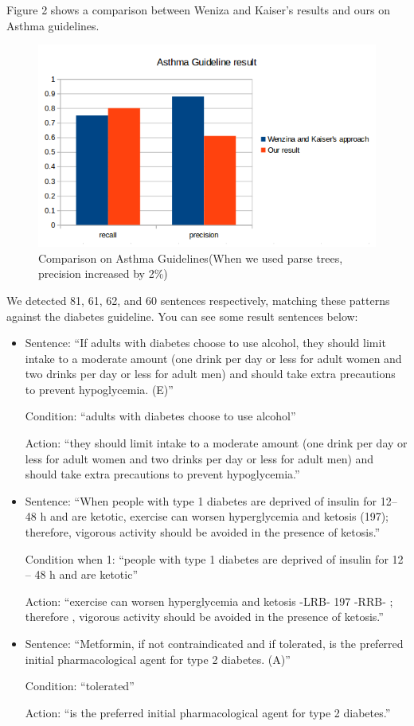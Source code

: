 \documentclass[12pt,letterpaper]{article}
\begin{document}
Figure 2 shows a comparison between Weniza and Kaiser's results and ours on Asthma guidelines.
\begin{figure}
\includegraphics[width=\textwidth]{Comparison}
\caption{Comparison on Asthma Guidelines(When we used parse trees, precision increased by 2\%)}
\end{figure}

We detected 81, 61, 62, and 60 sentences respectively, matching these patterns against the diabetes guideline. You can see some result sentences below:

\begin{itemize}
\item Sentence: ``If adults with diabetes choose to use alcohol, they should limit intake to a moderate amount (one drink per day or less for adult women and two drinks per  day or less for  adult men) and should take extra precautions to prevent hypoglycemia. (E)''

Condition: ``adults with diabetes choose to use alcohol''

Action: ``they should limit intake to a moderate amount (one drink per day or less for adult women and two drinks per day or less for adult men) and should take extra precautions to prevent hypoglycemia.''

\item Sentence: ``When people with type 1 diabetes are deprived of insulin for 12– 48 h and are ketotic, exercise can worsen hyperglycemia and ketosis (197); therefore, vigorous activity should be avoided in the presence of ketosis.''

Condition when 1: ``people with type 1 diabetes are deprived of insulin for 12 -- 48 h and are ketotic''

Action: ``exercise can worsen hyperglycemia and ketosis -LRB- 197 -RRB- ; therefore , vigorous activity should be avoided in the presence of ketosis.''

\item Sentence: ``Metformin, if not contraindicated and if tolerated, is the preferred initial pharmacological agent for type 2 diabetes. (A)''

Condition: ``tolerated''

Action: ``is the preferred initial pharmacological agent for type 2 diabetes.''
\end{itemize}
\end{document}
